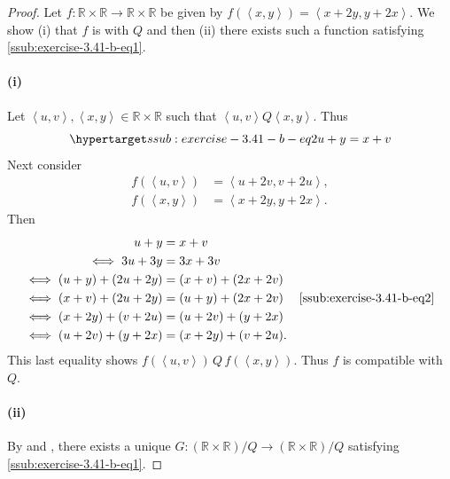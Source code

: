\documentclass{report}
\newcommand{\pair}[1]{\left< #1 \right>}
\begin{document}
\begin{proof}

  Let $f \colon \mathbb{R} \times \mathbb{R}
    \rightarrow \mathbb{R} \times \mathbb{R}$ be given by
    $f(\pair{x, y}) = \pair{x + 2y, y + 2x}$.
  We show (i) that $f$ is  with $Q$ and then (ii)
    there exists such a function satisfying \eqref{ssub:exercise-3.41-b-eq1}.

  \paragraph{(i)}%

    Let $\pair{u, v}, \pair{x, y} \in \mathbb{R} \times \mathbb{R}$ such that
      $\pair{u, v} Q \pair{x, y}$.
    Thus
      \begin{equation}
        \hyperlabel{ssub:exercise-3.41-b-eq2}
        u + y = x + v
      \end{equation}
    Next consider
      \begin{align*}
        f(\pair{u, v}) & = \pair{u + 2v, v + 2u}, \\
        f(\pair{x, y}) & = \pair{x + 2y, y + 2x}.
      \end{align*}
    Then
      \begin{align*}
             u + y & = x + v \\
        \iff 3u + 3y & = 3x + 3v \\
        \iff (u + y) + (2u + 2y) & = (x + v) + (2x + 2v) \\
        \iff (x + v) + (2u + 2y) & = (u + y) + (2x + 2v)
          & \eqref{ssub:exercise-3.41-b-eq2} \\
        \iff (x + 2y) + (v + 2u) & = (u + 2v) + (y + 2x) \\
        \iff (u + 2v) + (y + 2x) & = (x + 2y) + (v + 2u).
      \end{align*}
    This last equality shows $f(\pair{u, v}) \,Q\, f(\pair{x, y})$.
    Thus $f$ is compatible with $Q$.

  \paragraph{(ii)}%

    By  and , there
      exists a unique $G \colon (\mathbb{R} \times \mathbb{R}) / Q \rightarrow
      (\mathbb{R} \times \mathbb{R}) / Q$ satisfying
      \eqref{ssub:exercise-3.41-b-eq1}.

\end{proof}
\end{document}
